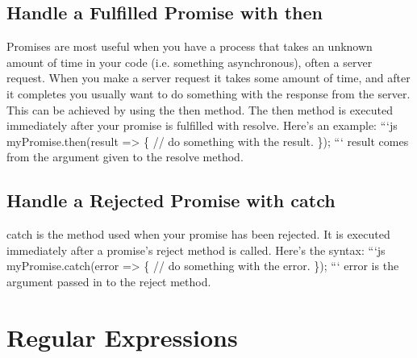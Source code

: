 \documentclass{article}%
\begin{document}
%
\subsection{Handle a Fulfilled Promise with then}%
\label{subsec:HandleaFulfilledPromisewiththen}%
Promises are most useful when you have a process that takes an unknown amount of time in your code (i.e. something asynchronous), often a server request. When you make a server request it takes some amount of time, and after it completes you usually want to do something with the response from the server. This can be achieved by using the then method. The then method is executed immediately after your promise is fulfilled with resolve. Here’s an example:\newline%
```js\newline%
myPromise.then(result => \{\newline%
  // do something with the result.\newline%
\});\newline%
```\newline%
result comes from the argument given to the resolve method.\newline%

%
\subsection{Handle a Rejected Promise with catch}%
\label{subsec:HandleaRejectedPromisewithcatch}%
catch is the method used when your promise has been rejected. It is executed immediately after a promise's reject method is called. Here’s the syntax:\newline%
```js\newline%
myPromise.catch(error => \{\newline%
  // do something with the error.\newline%
\});\newline%
```\newline%
error is the argument passed in to the reject method.\newline%

%
\newpage%
\section{Regular Expressions}%
\label{sec:RegularExpressions}%
\end{document}
